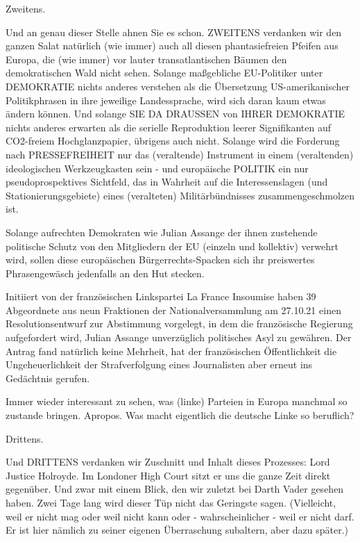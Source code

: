 \begin{multicols}{2}
Zweitens.

Und an genau dieser Stelle ahnen Sie es schon. ZWEITENS verdanken wir den ganzen Salat natürlich (wie
immer) auch all diesen phantasiefreien Pfeifen aus Europa, die (wie immer) vor lauter transatlantischen Bäumen den demokratischen Wald nicht sehen. Solange
maßgebliche EU-Politiker unter DEMOKRATIE nichts
anderes verstehen als die Übersetzung US-amerikanischer Politikphrasen in ihre jeweilige Landessprache,
wird sich daran kaum etwas ändern können. Und solange SIE DA DRAUSSEN von IHRER DEMOKRATIE nichts
anderes erwarten als die serielle Reproduktion leerer Signifikanten auf CO2-freiem Hochglanzpapier, übrigens
auch nicht. Solange wird die Forderung nach PRESSEFREIHEIT nur das (veraltende) Instrument in einem
(veraltenden) ideologischen Werkzeugkasten sein - und
europäische POLITIK ein nur pseudoprospektives Sichtfeld, das in Wahrheit auf die Interessenslagen (und Stationierungsgebiete) eines (veralteten) Militärbündnisses
zusammengeschmolzen ist.

Solange aufrechten Demokraten wie Julian Assange der
ihnen zustehende politische Schutz von den Mitgliedern
der EU (einzeln und kollektiv) verwehrt wird, sollen diese europäischen Bürgerrechts-Spacken sich ihr preiswertes Phrasengewäsch jedenfalls an den Hut stecken.

Initiiert von der französischen Linkspartei La France Insoumise haben 39 Abgeordnete aus neun Fraktionen der
Nationalversammlung am 27.10.21 einen Resolutionsentwurf zur Abstimmung vorgelegt, in dem die französische Regierung aufgefordert wird, Julian Assange unverzüglich politisches Asyl zu gewähren. Der Antrag fand
natürlich keine Mehrheit, hat der französischen Öffentlichkeit die Ungeheuerlichkeit der Strafverfolgung eines
Journalisten aber erneut ins Gedächtnis gerufen.

Immer wieder interessant zu sehen, was (linke) Parteien
in Europa manchmal so zustande bringen. Apropos. Was
macht eigentlich die deutsche Linke so beruflich?

Drittens.

Und DRITTENS verdanken wir Zuschnitt und Inhalt dieses Prozesses: Lord Justice Holroyde. Im Londoner High
Court sitzt er uns die ganze Zeit direkt gegenüber. Und
zwar mit einem Blick, den wir zuletzt bei Darth Vader gesehen haben. Zwei Tage lang wird dieser Tüp nicht das
Geringste sagen. (Vielleicht, weil er nicht mag oder weil
nicht kann oder - wahrscheinlicher - weil er nicht darf.
Er ist hier nämlich zu seiner eigenen Überraschung subaltern, aber dazu später.)


\end{multicols}
